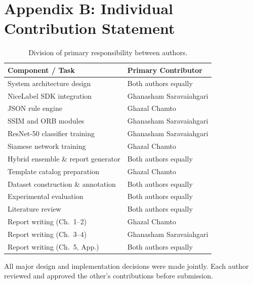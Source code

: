 \chapter{Appendix B: Individual Contribution Statement}
\label{app:contributions}

\begin{table}[h]
\centering
\caption{Division of primary responsibility between authors.}
\begin{tabular}{ll}
\toprule
\textbf{Component / Task} & \textbf{Primary Contributor} \\
\midrule
System architecture design         & Both authors equally \\
NiceLabel SDK integration           & Ghanasham Saravaiahgari \\
JSON rule engine                    & Ghazal Chamto \\
SSIM and ORB modules                & Ghanasham Saravaiahgari \\
ResNet-50 classifier training       & Ghanasham Saravaiahgari \\
Siamese network training            & Ghazal Chamto \\
Hybrid ensemble \& report generator & Both authors equally \\
Template catalog preparation        & Ghazal Chamto \\
Dataset construction \& annotation  & Both authors equally \\
Experimental evaluation             & Both authors equally \\
Literature review                   & Both authors equally \\
Report writing (Ch.\ 1–2)           & Ghazal Chamto \\
Report writing (Ch.\ 3–4)           & Ghanasham Saravaiahgari \\
Report writing (Ch.\ 5, App.)       & Both authors equally \\
\bottomrule
\end{tabular}
\end{table}

All major design and implementation decisions were made jointly. Each author reviewed
and approved the other's contributions before submission.
